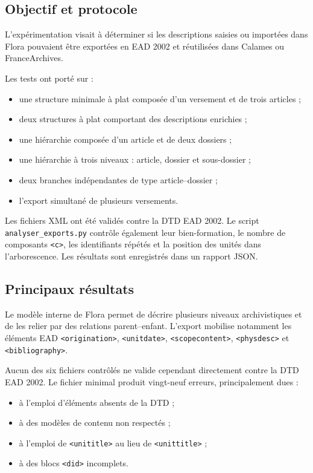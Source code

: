 \subsection{Objectif et protocole}

L'expérimentation visait à déterminer si les descriptions saisies ou importées dans Flora pouvaient être exportées en EAD 2002 et réutilisées dans Calames ou FranceArchives.

Les tests ont porté sur :

\begin{itemize}
	\item une structure minimale à plat composée d'un versement et de trois articles ;
	\item deux structures à plat comportant des descriptions enrichies ;
	\item une hiérarchie composée d'un article et de deux dossiers ;
	\item une hiérarchie à trois niveaux : article, dossier et sous-dossier ;
	\item deux branches indépendantes de type article--dossier ;
	\item l'export simultané de plusieurs versements.
\end{itemize}

Les fichiers XML ont été validés contre la DTD EAD 2002. Le script \texttt{analyser\_exports.py} contrôle également leur bien-formation, le nombre de composants \texttt{<c>}, les identifiants répétés et la position des unités dans l'arborescence. Les résultats sont enregistrés dans un rapport JSON.

\subsection{Principaux résultats}

Le modèle interne de Flora permet de décrire plusieurs niveaux archivistiques et de les relier par des relations parent--enfant. L'export mobilise notamment les éléments EAD \texttt{<origination>}, \texttt{<unitdate>}, \texttt{<scopecontent>}, \texttt{<physdesc>} et \texttt{<bibliography>}.

Aucun des six fichiers contrôlés ne valide cependant directement contre la DTD EAD 2002. Le fichier minimal produit vingt-neuf erreurs, principalement dues :

\begin{itemize}
	\item à l'emploi d'éléments absents de la DTD ;
	\item à des modèles de contenu non respectés ;
	\item à l'emploi de \texttt{<unititle>} au lieu de \texttt{<unittitle>} ;
	\item à des blocs \texttt{<did>} incomplets.
\end{itemize}

